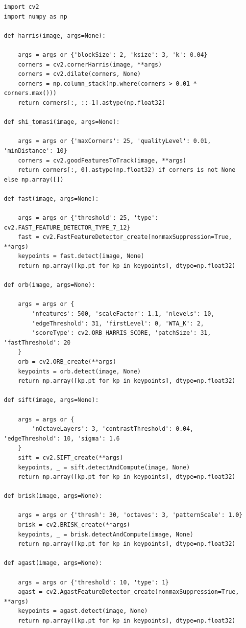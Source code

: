 \documentclass[journal]{IEEEtran}
\begin{document}
\begin{lstlisting}[style=python, caption={All Corner Detection Wrappers}, label={lst:corner_methods}]
import cv2
import numpy as np

def harris(image, args=None):

    args = args or {'blockSize': 2, 'ksize': 3, 'k': 0.04}
    corners = cv2.cornerHarris(image, **args)
    corners = cv2.dilate(corners, None)
    corners = np.column_stack(np.where(corners > 0.01 * corners.max()))
    return corners[:, ::-1].astype(np.float32)

def shi_tomasi(image, args=None):

    args = args or {'maxCorners': 25, 'qualityLevel': 0.01, 'minDistance': 10}
    corners = cv2.goodFeaturesToTrack(image, **args)
    return corners[:, 0].astype(np.float32) if corners is not None else np.array([])

def fast(image, args=None):

    args = args or {'threshold': 25, 'type': cv2.FAST_FEATURE_DETECTOR_TYPE_7_12}
    fast = cv2.FastFeatureDetector_create(nonmaxSuppression=True, **args)
    keypoints = fast.detect(image, None)
    return np.array([kp.pt for kp in keypoints], dtype=np.float32)

def orb(image, args=None):

    args = args or {
        'nfeatures': 500, 'scaleFactor': 1.1, 'nlevels': 10,
        'edgeThreshold': 31, 'firstLevel': 0, 'WTA_K': 2,
        'scoreType': cv2.ORB_HARRIS_SCORE, 'patchSize': 31, 'fastThreshold': 20
    }
    orb = cv2.ORB_create(**args)
    keypoints = orb.detect(image, None)
    return np.array([kp.pt for kp in keypoints], dtype=np.float32)

def sift(image, args=None):

    args = args or {
        'nOctaveLayers': 3, 'contrastThreshold': 0.04, 'edgeThreshold': 10, 'sigma': 1.6
    }
    sift = cv2.SIFT_create(**args)
    keypoints, _ = sift.detectAndCompute(image, None)
    return np.array([kp.pt for kp in keypoints], dtype=np.float32)

def brisk(image, args=None):

    args = args or {'thresh': 30, 'octaves': 3, 'patternScale': 1.0}
    brisk = cv2.BRISK_create(**args)
    keypoints, _ = brisk.detectAndCompute(image, None)
    return np.array([kp.pt for kp in keypoints], dtype=np.float32)

def agast(image, args=None):

    args = args or {'threshold': 10, 'type': 1}
    agast = cv2.AgastFeatureDetector_create(nonmaxSuppression=True, **args)
    keypoints = agast.detect(image, None)
    return np.array([kp.pt for kp in keypoints], dtype=np.float32)


\end{lstlisting}
\end{document}
